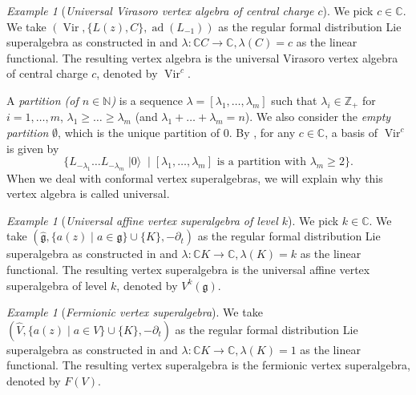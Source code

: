 \documentclass[a4paper, 12pt, reqno]{amsart}
\theoremstyle{remark}
\newtheorem{example}[theorem]{Example}
\DeclareMathOperator{\Vir}{Vir}
\DeclareMathOperator{\vac}{|0\rangle}
\DeclareMathOperator{\ad}{ad}
\begin{document}
\begin{example}[\emph{Universal Virasoro vertex algebra of central charge $c$}]
  \label{exa:5}
  We pick $c \in \mathbb{C}$.
  We take $(\Vir, \{L(z), C\}, \ad(L_{-1}))$ as the regular formal distribution Lie superalgebra as constructed in  and $\lambda: \mathbb{C}C \to \mathbb{C}, \lambda(C) = c$ as the linear functional.
  The resulting vertex algebra is the universal Virasoro vertex algebra of central charge $c$, denoted by $\Vir^c$.

  A \emph{partition (of $n \in \mathbb{N}$)} is a sequence $\lambda = [\lambda_1, \dots, \lambda_m]$ such that $\lambda_i \in \mathbb{Z}_+$ for $i = 1, \dots, m$, $\lambda_1 \ge \dots \ge \lambda_m$ (and $\lambda_1 + \dots + \lambda_m = n$).
  We also consider the \emph{empty partition} $\emptyset$, which is the unique partition of $0$.
  By , for any $c \in \mathbb{C}$, a basis of $\Vir^c$ is given by
  \begin{equation*}
    \{L_{-\lambda_1}\dots L_{-\lambda_m}\vac \mid \text{$[\lambda_1, \dots, \lambda_m]$ is a partition with $\lambda_m \ge 2$}\}.
  \end{equation*}
  When we deal with conformal vertex superalgebras, we will explain why this vertex algebra is called universal.
\end{example}

\begin{example}[\emph{Universal affine vertex superalgebra of level $k$}]
  \label{exa:6}
  We pick $k \in \mathbb{C}$.
  We take $(\hat{\mathfrak{g}}, \{a(z) \mid a \in \mathfrak{g}\} \cup \{K\}, -\partial_t)$ as the regular formal distribution Lie superalgebra as constructed in  and $\lambda: \mathbb{C}K \to \mathbb{C}, \lambda(K) = k$ as the linear functional.
  The resulting vertex superalgebra is the universal affine vertex superalgebra of level $k$, denoted by $V^k(\mathfrak{g})$.
\end{example}

\begin{example}[\emph{Fermionic vertex superalgebra}]
  \label{exa:7}
  We take $(\widehat{V}, \{a(z) \mid a \in V\} \cup \{K\}, -\partial_t)$ as the regular formal distribution Lie superalgebra as constructed in  and $\lambda: \mathbb{C}K \to \mathbb{C}, \lambda(K) = 1$ as the linear functional.
  The resulting vertex superalgebra is the fermionic vertex superalgebra, denoted by $F(V)$.
\end{example}
\end{document}
